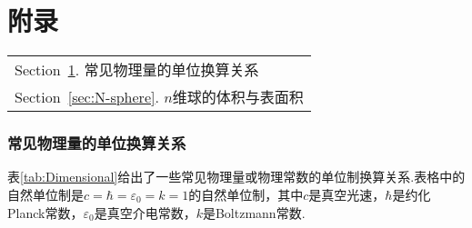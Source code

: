 \part{附录}\label{Part:Appendix}
	
		\begin{margintable}\vspace{1.4in}\footnotesize
			\begin{tabularx}{\marginparwidth}{|X}
			Section~\ref{sec:Dimensional}. 常见物理量的单位换算关系\\
			Section~\ref{sec:N-sphere}. $n$维球的体积与表面积\\
			\end{tabularx}
		\end{margintable}

		\section{常见物理量的单位换算关系}\label{sec:Dimensional}
			表\ref{tab:Dimensional}给出了一些常见物理量或物理常数的单位制换算关系.表格中的自然单位制是$c=\hbar=\varepsilon_0=k=1$的自然单位制，其中$c$是真空光速，$\hbar$是约化Planck常数，$\varepsilon_0$是真空介电常数，$k$是Boltzmann常数.
		
